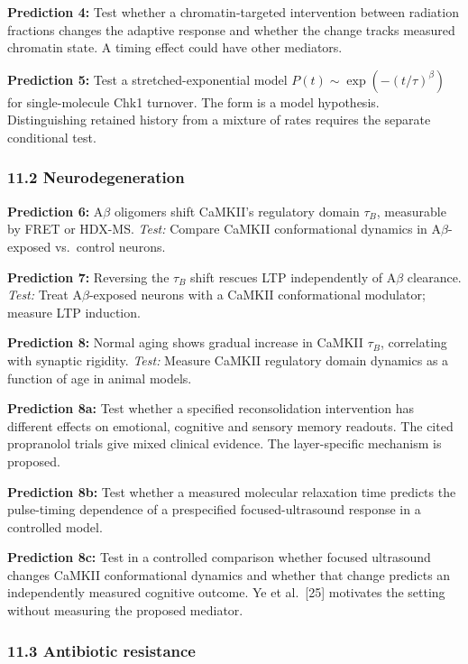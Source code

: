 \documentclass[
]{article}
\begin{document}
\textbf{Prediction 4:} Test whether a chromatin-targeted intervention
between radiation fractions changes the adaptive response and whether
the change tracks measured chromatin state. A timing effect could have
other mediators.

\textbf{Prediction 5:} Test a stretched-exponential model
\(P(t)\sim\exp(-(t/\tau)^\beta)\) for single-molecule Chk1 turnover. The
form is a model hypothesis. Distinguishing retained history from a
mixture of rates requires the separate conditional test.

\hypertarget{neurodegeneration-1}{%
\subsubsection{11.2 Neurodegeneration}\label{neurodegeneration-1}}

\textbf{Prediction 6:} A\(\beta\) oligomers shift CaMKII's regulatory
domain \(\tau_B\), measurable by FRET or HDX-MS. \emph{Test:} Compare
CaMKII conformational dynamics in A\(\beta\)-exposed vs.~control
neurons.

\textbf{Prediction 7:} Reversing the \(\tau_B\) shift rescues LTP
independently of A\(\beta\) clearance. \emph{Test:} Treat
A\(\beta\)-exposed neurons with a CaMKII conformational modulator;
measure LTP induction.

\textbf{Prediction 8:} Normal aging shows gradual increase in CaMKII
\(\tau_B\), correlating with synaptic rigidity. \emph{Test:} Measure
CaMKII regulatory domain dynamics as a function of age in animal models.

\textbf{Prediction 8a:} Test whether a specified reconsolidation
intervention has different effects on emotional, cognitive and sensory
memory readouts. The cited propranolol trials give mixed clinical
evidence. The layer-specific mechanism is proposed.

\textbf{Prediction 8b:} Test whether a measured molecular relaxation
time predicts the pulse-timing dependence of a prespecified
focused-ultrasound response in a controlled model.

\textbf{Prediction 8c:} Test in a controlled comparison whether focused
ultrasound changes CaMKII conformational dynamics and whether that
change predicts an independently measured cognitive outcome. Ye et
al.~{[}25{]} motivates the setting without measuring the proposed
mediator.

\hypertarget{antibiotic-resistance-1}{%
\subsubsection{11.3 Antibiotic
resistance}\label{antibiotic-resistance-1}}
\end{document}
